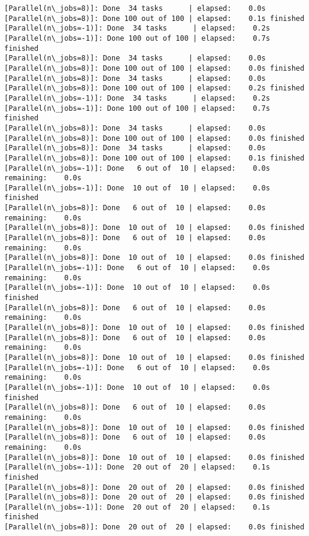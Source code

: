 \documentclass[11pt]{article}
\begin{document}
\begin{Verbatim}[commandchars=\\\{\}]
[Parallel(n\_jobs=8)]: Done  34 tasks      | elapsed:    0.0s
[Parallel(n\_jobs=8)]: Done 100 out of 100 | elapsed:    0.1s finished
[Parallel(n\_jobs=-1)]: Done  34 tasks      | elapsed:    0.2s
[Parallel(n\_jobs=-1)]: Done 100 out of 100 | elapsed:    0.7s finished
[Parallel(n\_jobs=8)]: Done  34 tasks      | elapsed:    0.0s
[Parallel(n\_jobs=8)]: Done 100 out of 100 | elapsed:    0.0s finished
[Parallel(n\_jobs=8)]: Done  34 tasks      | elapsed:    0.0s
[Parallel(n\_jobs=8)]: Done 100 out of 100 | elapsed:    0.2s finished
[Parallel(n\_jobs=-1)]: Done  34 tasks      | elapsed:    0.2s
[Parallel(n\_jobs=-1)]: Done 100 out of 100 | elapsed:    0.7s finished
[Parallel(n\_jobs=8)]: Done  34 tasks      | elapsed:    0.0s
[Parallel(n\_jobs=8)]: Done 100 out of 100 | elapsed:    0.0s finished
[Parallel(n\_jobs=8)]: Done  34 tasks      | elapsed:    0.0s
[Parallel(n\_jobs=8)]: Done 100 out of 100 | elapsed:    0.1s finished
[Parallel(n\_jobs=-1)]: Done   6 out of  10 | elapsed:    0.0s remaining:    0.0s
[Parallel(n\_jobs=-1)]: Done  10 out of  10 | elapsed:    0.0s finished
[Parallel(n\_jobs=8)]: Done   6 out of  10 | elapsed:    0.0s remaining:    0.0s
[Parallel(n\_jobs=8)]: Done  10 out of  10 | elapsed:    0.0s finished
[Parallel(n\_jobs=8)]: Done   6 out of  10 | elapsed:    0.0s remaining:    0.0s
[Parallel(n\_jobs=8)]: Done  10 out of  10 | elapsed:    0.0s finished
[Parallel(n\_jobs=-1)]: Done   6 out of  10 | elapsed:    0.0s remaining:    0.0s
[Parallel(n\_jobs=-1)]: Done  10 out of  10 | elapsed:    0.0s finished
[Parallel(n\_jobs=8)]: Done   6 out of  10 | elapsed:    0.0s remaining:    0.0s
[Parallel(n\_jobs=8)]: Done  10 out of  10 | elapsed:    0.0s finished
[Parallel(n\_jobs=8)]: Done   6 out of  10 | elapsed:    0.0s remaining:    0.0s
[Parallel(n\_jobs=8)]: Done  10 out of  10 | elapsed:    0.0s finished
[Parallel(n\_jobs=-1)]: Done   6 out of  10 | elapsed:    0.0s remaining:    0.0s
[Parallel(n\_jobs=-1)]: Done  10 out of  10 | elapsed:    0.0s finished
[Parallel(n\_jobs=8)]: Done   6 out of  10 | elapsed:    0.0s remaining:    0.0s
[Parallel(n\_jobs=8)]: Done  10 out of  10 | elapsed:    0.0s finished
[Parallel(n\_jobs=8)]: Done   6 out of  10 | elapsed:    0.0s remaining:    0.0s
[Parallel(n\_jobs=8)]: Done  10 out of  10 | elapsed:    0.0s finished
[Parallel(n\_jobs=-1)]: Done  20 out of  20 | elapsed:    0.1s finished
[Parallel(n\_jobs=8)]: Done  20 out of  20 | elapsed:    0.0s finished
[Parallel(n\_jobs=8)]: Done  20 out of  20 | elapsed:    0.0s finished
[Parallel(n\_jobs=-1)]: Done  20 out of  20 | elapsed:    0.1s finished
[Parallel(n\_jobs=8)]: Done  20 out of  20 | elapsed:    0.0s finished

\end{Verbatim}
\end{document}
